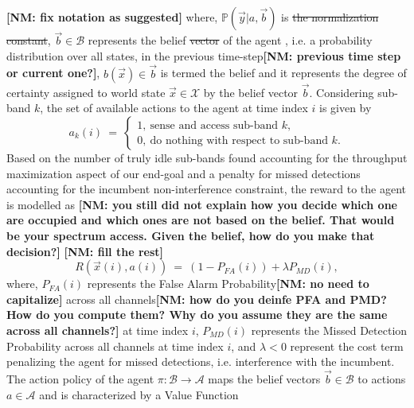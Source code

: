 \documentclass[10pt,twocolumn]{IEEEtran}
\newcommand{\sst}[1]{\st{#1}}
\newcommand{\nm}[1]{{\color{blue}\bf{[NM: #1]}}}
\newcommand{\add}[1]{{\color{red}{#1}}}
\begin{document}
\nm{fix notation as suggested}
where, $\mathbb{P}(\vec{y}|a,\vec{b})$ is \sst{the normalization constant}\add{given by \eqref{9}}, \sst{$\vec{b} \in \mathcal{B}$} \add{$b \in \mathcal{B}$} represents the belief \sst{vector} of the agent \add{prior to the observation $\vec{Y}(i)$}, i.e. a probability distribution over all states, in the previous time-step\nm{previous time step or current one?}, $b(\vec{x}) \in \vec{b}$ is termed the belief and it represents the degree of certainty assigned to world state $\vec{x} \in \mathcal{X}$ by the belief vector $\vec{b}$.
Considering sub-band $k$, the set of available actions to the agent at time index $i$ is given by
\begin{equation}\label{12}
    a_k(i)\ =\ 
    \begin{cases}
        1,\ \text{sense and access sub-band $k$},\\
        0,\ \text{do nothing with respect to sub-band $k$}.
    \end{cases}
\end{equation}
Based on the number of truly idle sub-bands found accounting for the throughput maximization aspect of our end-goal and a penalty for missed detections accounting for the incumbent non-interference constraint, the reward to the agent is modelled as
\nm{you still did not explain how you decide which one are occupied and which ones are not based on the belief. That would be your spectrum access. Given the belief, how do you make that decision?}
\add{Given the belief $b_i$, the SU uses a threshold based mechanism to access the spectrum: if $\mathbb P(B_k(i)=0|b_i)>\tau$, then the $k$th spectrum band is detected as idle and it is accessed by the SU; otherwise, it is detected as occupied and is left unused. Therefore, the probability of false alarm and misdetection are given by .....
}\nm{fill the rest}
\begin{equation}\label{13}
    R(\vec{x}(i),a(i))\ =\ (1 - P_{FA}(i)) + \lambda P_{MD}(i),
\end{equation}
where, $P_{FA}(i)$ represents the False Alarm Probability\nm{no need to capitalize} across all channels\nm{how do you deinfe PFA and PMD? How do you compute them? Why do you assume they are the same across all channels?} at time index $i$, $P_{MD}(i)$ represents the Missed Detection Probability across all channels at time index $i$, and $\lambda < 0$ represent the cost term penalizing the agent for missed detections, i.e. interference with the incumbent. The action policy of the agent $\pi: \mathcal{B} \rightarrow \mathcal{A}$ maps the belief vectors $\vec{b} \in \mathcal{B}$ to actions $a \in \mathcal{A}$ and is characterized by a Value Function
\end{document}
